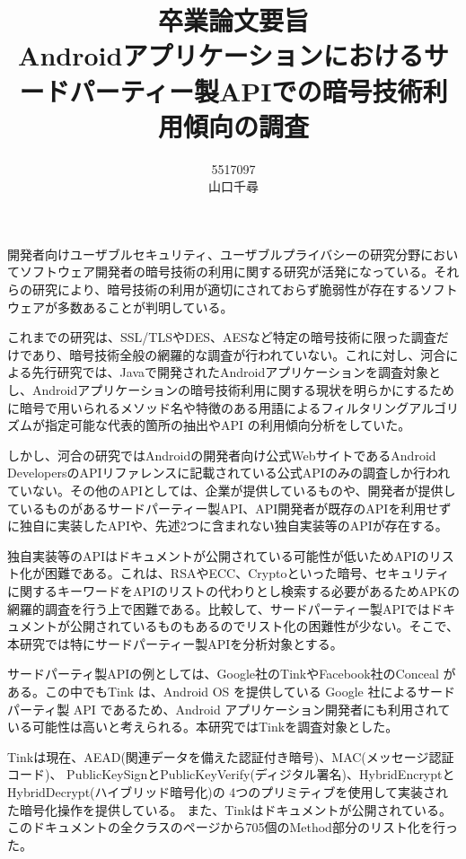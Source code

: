 \documentclass[twocolumn, 10pt, a4paper]{jarticle}
\title{\vspace{-3cm}
{\large 卒業論文要旨}\\
{\bf
Androidアプリケーションにおけるサードパーティー製APIでの暗号技術利用傾向の調査
}
}
\author{
5517097 \\		%
山口千尋		%
}
\date{}
\begin{document}
\maketitle
\thispagestyle{empty}

開発者向けユーザブルセキュリティ、ユーザブルプライバシーの研究分野においてソフトウェア開発者の暗号技術の利用に関する研究が活発になっている。それらの研究により、暗号技術の利用が適切にされておらず脆弱性が存在するソフトウェアが多数あることが判明している。

これまでの研究は、SSL/TLSやDES、AESなど特定の暗号技術に限った調査だけであり、暗号技術全般の網羅的な調査が行われていない。これに対し、河合による先行研究\cite{Kawai}では、Javaで開発されたAndroidアプリケーションを調査対象とし、Androidアプリケーションの暗号技術利用に関する現状を明らかにするために暗号で用いられるメソッド名や特徴のある用語によるフィルタリングアルゴリズムが指定可能な代表的箇所の抽出やAPI の利用傾向分析をしていた。


しかし、河合の研究ではAndroidの開発者向け公式WebサイトであるAndroid Developers\cite{Android_Developers}のAPIリファレンスに記載されている公式APIのみの調査しか行われていない。その他のAPIとしては、企業が提供しているものや、開発者が提供しているものがあるサードパーティー製API、API開発者が既存のAPIを利用せずに独自に実装したAPIや、先述2つに含まれない独自実装等のAPIが存在する。


独自実装等のAPIはドキュメントが公開されている可能性が低いためAPIのリスト化が困難である。これは、RSAやECC、Cryptoといった暗号、セキュリティに関するキーワードをAPIのリストの代わりとし検索する必要があるためAPKの網羅的調査を行う上で困難である。比較して、サードパーティー製APIではドキュメントが公開されているものもあるのでリスト化の困難性が少ない。そこで、本研究では特にサードパーティー製APIを分析対象とする。

サードパーティ製APIの例としては、Google社のTink\cite{Tink}やFacebook社のConceal\cite{Conceal}
がある。この中でもTink は、Android OS を提供している Google 社によるサードパーティ製 API であるため、Android
アプリケーション開発者にも利用されている可能性は高いと考えられる。本研究ではTinkを調査対象とした。

Tinkは現在、AEAD(関連データを備えた認証付き暗号)、MAC(メッセージ認証コード)、
PublicKeySignとPublicKeyVerify(ディジタル署名)、HybridEncryptとHybridDecrypt(ハイブリッド暗号化)の
4つのプリミティブを使用して実装された暗号化操作を提供している。
また、Tinkはドキュメントが公開されている。
このドキュメントの全クラスのページから705個のMethod部分のリスト化を行った。
\end{document}

